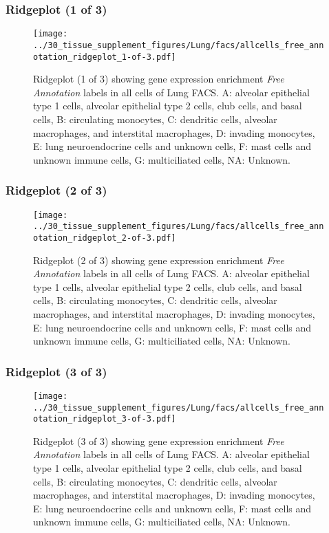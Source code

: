 \clearpage

\subsubsection{Ridgeplot (1 of 3)}
\begin{figure}[h]
\centering
\texttt{[image: ../30\_tissue\_supplement\_figures/Lung/facs/allcells\_free\_annotation\_ridgeplot\_1-of-3.pdf]}

\caption{ Ridgeplot (1 of 3)  showing gene expression enrichment \emph{Free Annotation} labels in all cells of Lung FACS. A: alveolar epithelial type 1 cells, alveolar epithelial type 2 cells, club cells, and basal cells, B: circulating monocytes, C: dendritic cells, alveolar macrophages, and interstital macrophages, D: invading monocytes, E: lung neuroendocrine cells and unknown cells, F: mast cells and unknown immune cells, G: multiciliated cells, NA: Unknown.}
\end{figure}


\clearpage

\subsubsection{Ridgeplot (2 of 3)}
\begin{figure}[h]
\centering
\texttt{[image: ../30\_tissue\_supplement\_figures/Lung/facs/allcells\_free\_annotation\_ridgeplot\_2-of-3.pdf]}

\caption{ Ridgeplot (2 of 3)  showing gene expression enrichment \emph{Free Annotation} labels in all cells of Lung FACS. A: alveolar epithelial type 1 cells, alveolar epithelial type 2 cells, club cells, and basal cells, B: circulating monocytes, C: dendritic cells, alveolar macrophages, and interstital macrophages, D: invading monocytes, E: lung neuroendocrine cells and unknown cells, F: mast cells and unknown immune cells, G: multiciliated cells, NA: Unknown.}
\end{figure}


\clearpage

\subsubsection{Ridgeplot (3 of 3)}
\begin{figure}[h]
\centering
\texttt{[image: ../30\_tissue\_supplement\_figures/Lung/facs/allcells\_free\_annotation\_ridgeplot\_3-of-3.pdf]}

\caption{ Ridgeplot (3 of 3)  showing gene expression enrichment \emph{Free Annotation} labels in all cells of Lung FACS. A: alveolar epithelial type 1 cells, alveolar epithelial type 2 cells, club cells, and basal cells, B: circulating monocytes, C: dendritic cells, alveolar macrophages, and interstital macrophages, D: invading monocytes, E: lung neuroendocrine cells and unknown cells, F: mast cells and unknown immune cells, G: multiciliated cells, NA: Unknown.}
\end{figure}


